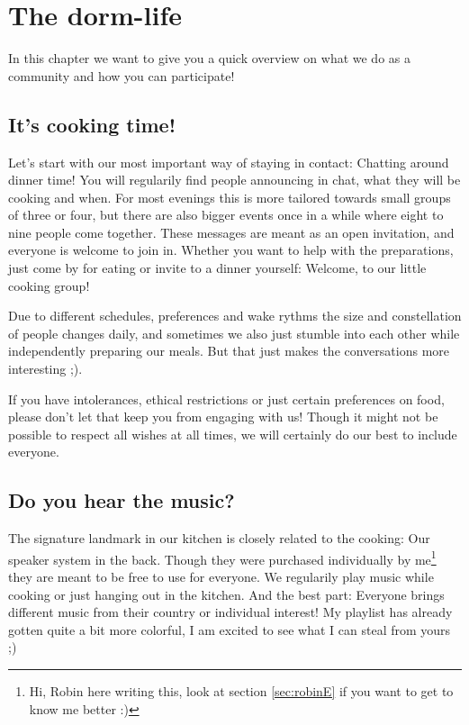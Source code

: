 \chapter{The dorm-life} \label{chap:activities}

In this chapter we want to give you a quick overview on what we do as a community and how you can participate!

\section{It's cooking time!} \label{sec:cooking}
Let's start with our most important way of staying in contact: Chatting around dinner time! You will regularily find people announcing in chat, what they will be cooking and when. For most evenings this is more tailored towards small groups of three or four, but there are also bigger events once in a while where eight to nine people come together. These messages are meant as an open invitation, and everyone is welcome to join in. Whether you want to help with the preparations, just come by for eating or invite to a dinner yourself: Welcome, to our little cooking group!

Due to different schedules, preferences and wake rythms the size and constellation of people changes daily, and sometimes we also just stumble into each other while independently preparing our meals. But that just makes the conversations more interesting ;). 

If you have intolerances, ethical restrictions or just certain preferences on food, please don't let that keep you from engaging with us! Though it might not be possible to respect all wishes at all times, we will certainly do our best to include everyone.  

\section{Do you hear the music?} \label{sec:speakers}
The signature landmark in our kitchen is closely related to the cooking: Our speaker system in the back. Though they were purchased individually by me\footnote{Hi, Robin here writing this, look at section \ref{sec:robinE} if you want to get to know me better :)} they are meant to be free to use for everyone. We regularily play music while cooking or just hanging out in the kitchen. And the best part: Everyone brings different music from their country or individual interest! My playlist has already gotten quite a bit more colorful, I am excited to see what I can steal from yours ;)

